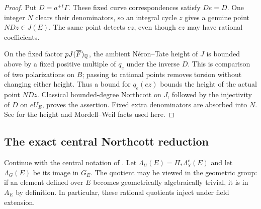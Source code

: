 \documentclass[11pt,a4paper]{article}
\newtheorem{theorem}{Theorem}[section]
\theoremstyle{definition}
\DeclareRobustCommand{\MathSecref}[1]{\begingroup\hypersetup{linkcolor=MathSectionLink}\Cref{#1}\endgroup}
\newcommand{\Q}{\mathbb Q}\newcommand{\R}{\mathbb R}\newcommand{\C}{\mathbb C}
\newcommand{\AJ}{\operatorname{AJ}}\newcommand{\Tr}{\operatorname{Tr}}
\numberwithin{equation}{section}
\begin{document}
\begin{proof}
Put \(D=a^+{}^t\Gamma\). These fixed curve correspondences satisfy
\(De=D\). One integer \(N\) clears their denominators, so an
integral cycle \(z\) gives a genuine point \(NDz\in J(E)\).
The same point detects \(ez\), even though \(ez\) may have
rational coefficients.

On the fixed factor \(pJ(\Fbar)_\Q\), the ambient Néron--Tate
height of \(J\) is bounded above by a fixed positive multiple of
\(q_e\) under the inverse \(D\). This is comparison of two
polarizations on \(B\); passing to rational points removes
torsion without changing either height. Thus a bound for
\(q_e(ez)\) bounds the height of the actual point \(NDz\).
Classical bounded-degree Northcott on \(J\), followed by the
injectivity of \(D\) on \(eU_E\), proves the assertion. Fixed
extra denominators are absorbed into \(N\). See
\cite[Sections~9--10]{ConradFeng} for the height and Mordell--Weil
facts used here.
\end{proof}

\subsection{The exact central Northcott reduction}
\label{sec:central-northcott}

Continue with the central notation of
\MathSecref{sec:central-projector}. Let
\(\Lambda_U(E)=\Pi_*\Lambda_Y^c(E)\) and let
\(\Lambda_G(E)\) be its image in \(G_E\). The quotient may be
viewed in the geometric group: if an element defined over \(E\)
becomes geometrically algebraically trivial, it is in \(A_E\) by
definition. In particular, these rational quotients inject under
field extension.

\end{document}
